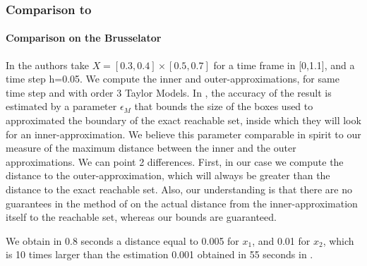\documentclass{sig-alternate-05-2015}
\newcommand\ForAuthors[1]%
 {\par\smallskip                     %
  \begin{center}%
   \fbox%
   {\parbox{0.9\linewidth}%
    {\raggedright\sc--- #1}%
   }%
  \end{center}%
  \par\smallskip                     %
 }
\begin{document}
\subsubsection{Comparison to \cite{underapprox16}}
\paragraph{Comparison on the Brusselator}
In \cite{underapprox16} the authors take $X=[0.3, 0.4] \times [0.5, 0.7]$ for a time frame in [0,1.1], and a time step h=0.05. 
We compute the inner and outer-approximations, for same time step and with order 3 Taylor Models.
In \cite{underapprox16}, the accuracy of the result is estimated by a parameter $\epsilon_M$ that bounds the size of 
the boxes used to approximated the boundary of the exact reachable set, inside which they will look for an inner-approximation. 
We believe this parameter comparable in spirit 
to our measure of the maximum distance between the inner and the outer approximations. We can point 2 differences. First, in our case 
we compute the distance to the outer-approximation, which will always be greater than the distance to the exact reachable set.
Also, our understanding is that there are no guarantees in the method of \cite{underapprox16} on the actual distance from the inner-approximation itself 
to the reachable set, whereas our bounds are guaranteed. 

We obtain in 0.8 seconds a distance equal to 0.005 for $x_1$, and 0.01 for $x_2$, which is 10 times larger than the estimation 0.001 obtained 
in 55 seconds in \cite{underapprox16}. 
\end{document}
